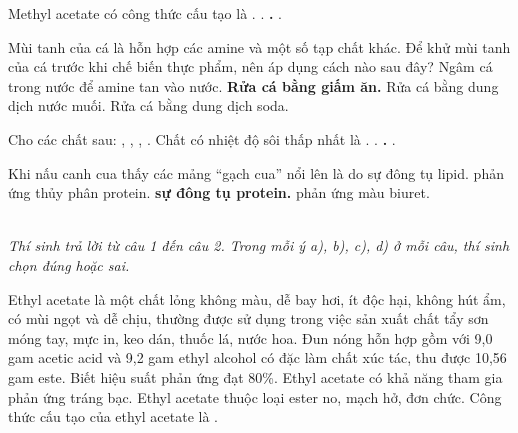 \documentclass[11pt,a4paper]{article}
\begin{document}
\begin{ex}
Methyl acetate có công thức cấu tạo là
\choice
{.}
{.}
{\textbf{\color{hfRed}.}}
{.}
\end{ex}
\begin{ex}
Mùi tanh của cá là hỗn hợp các amine và một số tạp chất khác. Để khử mùi tanh của cá trước khi chế biến thực phẩm, nên áp dụng cách nào sau đây?
\choice
{Ngâm cá trong nước để amine tan vào nước.}
{\textbf{\color{hfRed}Rửa cá bằng giấm ăn.}}
{Rửa cá bằng dung dịch nước muối.}
{Rửa cá bằng dung dịch soda.}
\end{ex}
\begin{ex}
Cho các chất sau: , , , . Chất có nhiệt độ sôi thấp nhất là
\choice
{.}
{.}
{\textbf{\color{hfRed}.}}
{.}
\end{ex}
\begin{ex}
Khi nấu canh cua thấy các mảng ``gạch cua'' nổi lên là do
\choice
{sự đông tụ lipid.}
{phản ứng thủy phân protein.}
{\textbf{\color{hfRed}sự đông tụ protein.}}
{phản ứng màu biuret.}
\end{ex}

\vspace{6pt}
 \\
\textit{Thí sinh trả lời từ câu 1 đến câu 2. Trong mỗi ý a), b), c), d) ở mỗi câu, thí sinh chọn đúng hoặc sai.}
\vspace{4pt}

\begin{ex}
Ethyl acetate là một chất lỏng không màu, dễ bay hơi, ít độc hại, không hút ẩm, có mùi ngọt và dễ chịu, thường được sử dụng trong việc sản xuất chất tẩy sơn móng tay, mực in, keo dán, thuốc lá, nước hoa.
\choiceTF
\True Đun nóng hỗn hợp gồm với 9,0 gam acetic acid và 9,2 gam ethyl alcohol có  đặc làm chất xúc tác, thu được 10,56 gam este. Biết hiệu suất phản ứng đạt 80\%.
Ethyl acetate có khả năng tham gia phản ứng tráng bạc.
\True Ethyl acetate thuộc loại ester no, mạch hở, đơn chức.
Công thức cấu tạo của ethyl acetate là .
\end{ex}
\end{document}
